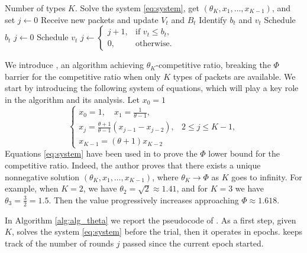 \begin{algorithm}[!t]
\caption{\algtheta}
\label{alg:alg_theta}
\small
\begin{algorithmic}[1]
    \REQUIRE Number of types $K$.
    \STATE Solve the system \eqref{eq:system}, get $(\theta_K, x_1, \ldots, x_{K - 1})$, and set $j \leftarrow 0$\label{line:system}
        \STATE Receive new packets and update $V_t$ and $B_t$
        \STATE Identify $b_t$ and $v_t$ \label{line:identify}
            \STATE Schedule $b_t$
            \STATE $j \leftarrow 0$  \label{line:restart_1}
        \ELSE
            \STATE Schedule $v_t$
            \STATE $j \leftarrow 
            \begin{cases}
              j+1, & \text{if } v_t \le b_t,\\
              0, & \text{otherwise. } 
            \end{cases}$
            \label{line:restart_2}
        \ENDIF
    \ENDFOR
\end{algorithmic}
\end{algorithm}
We introduce \algtheta, an algorithm achieving $\theta_K$-competitive ratio, breaking the $\Phi$ barrier for the competitive ratio when only $K$ types of packets are available. 
We start by introducing the following system of equations, which will play a key role in the algorithm and its analysis. Let $x_0 = 1$
\begin{equation}
\label{eq:system}
\begin{cases}
    x_0 = 1, \quad x_1 = \frac{1}{\theta-1}, \\[6pt]
    x_j = \frac{\theta+1}{\theta-1}(x_{j-1} - x_{j-2}), & 2 \le j \le K-1, \\[6pt]
    x_{K-1} = (\theta+1)x_{K-2}
\end{cases}
\end{equation}
Equations \eqref{eq:system} have been used in \citet{hajek2001competitiveness} to prove the $\Phi$ lower bound for the competitive ratio. Indeed, the author proves that there exists a unique nonnegative solution $(\theta_K, x_1, \ldots, x_{K - 1})$, where $\theta_K \rightarrow \Phi$ as $K$ goes to infinity. For example, when $K=2$, we have $\theta_2=\sqrt{2}\approx 1.41$, and for $K=3$ we have $\theta_3 = \frac{3}{2}=1.5$. Then the value progressively increases approaching $\Phi\approx 1.618$. 

In Algorithm \ref{alg:alg_theta} we report the pseudocode of \algtheta. As a first step, given $K$, \algtheta solves the system \eqref{eq:system} before the trial, then it operates in epochs. \algtheta keeps track of the number of rounds $j$ passed since the current epoch started.

